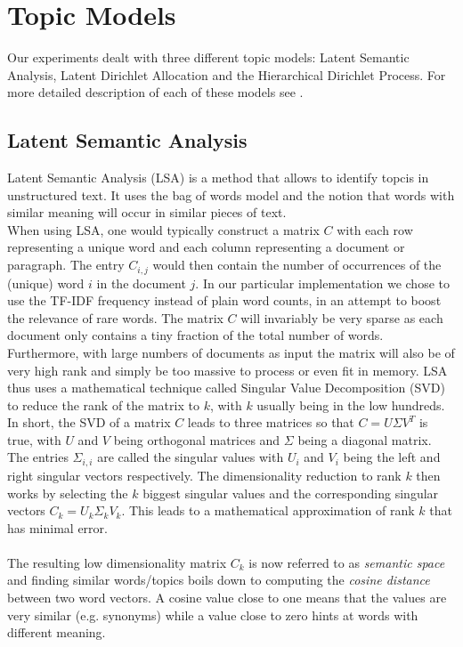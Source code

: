 \section{Topic Models}
Our experiments dealt with three different topic models: Latent Semantic Analysis, Latent Dirichlet Allocation and the Hierarchical Dirichlet Process. For more detailed description of each of these models see \cite{LSA_paper} \cite{LDA_paper} \cite{HDP_paper}.
\subsection{Latent Semantic Analysis}

Latent Semantic Analysis (LSA) is a method that allows to identify topcis in unstructured text. It uses the bag of words model and the notion that words with similar meaning will occur in similar pieces of text. \\
When using LSA, one would typically construct a matrix $C$  with each row representing a unique word and each column representing a document or paragraph. The entry $C_{i,j}$ would then contain the number of occurrences of the (unique) word $i$ in the document $j$. In our particular implementation we chose to use the TF-IDF frequency instead of plain word counts, in an attempt to boost the relevance of rare words. The matrix $C$ will invariably be very sparse as each document only contains a tiny fraction of the total number of words. Furthermore, with large numbers of documents as input the matrix will also be of very high rank and simply be too massive to process or even fit in memory. LSA thus uses a mathematical technique called Singular Value Decomposition (SVD) to reduce the rank of the matrix to $k$, with $k$ usually being in the low hundreds. In short, the SVD of a matrix $C$ leads to three matrices so that $C = U{\Sigma}V^T$ is true, with $U$ and $V$ being orthogonal matrices and $\Sigma$ being a diagonal matrix. The entries $\Sigma_{i,i}$ are called the singular values with $U_{i}$ and $V_{i}$ being the left and right singular vectors respectively. The dimensionality reduction to rank $k$ then works by selecting the $k$ biggest singular values and the corresponding singular vectors $C_{k} = U_{k}{\Sigma_{k}}V_{k}$. This leads to a mathematical approximation of rank $k$ that has minimal error.\\\\

The resulting low dimensionality matrix $C_{k}$ is now referred to as \emph{semantic space} and finding similar words/topics boils down to computing the \emph{cosine distance} between two word vectors. A cosine value close to one means that the values are very similar (e.g. synonyms) while a value close to zero hints at words with different meaning.
